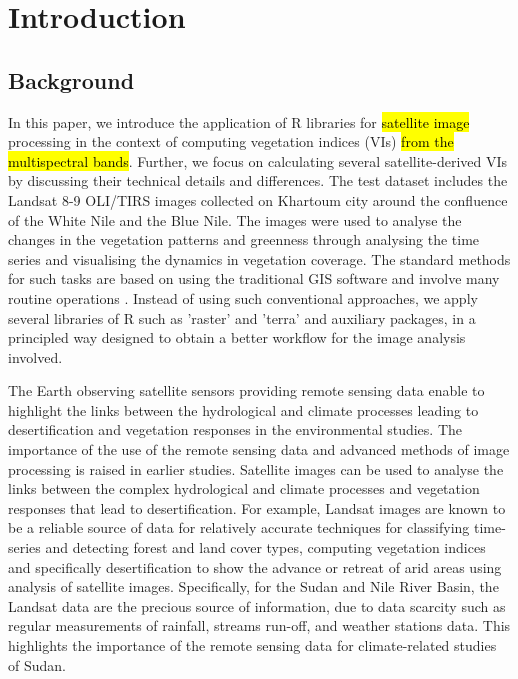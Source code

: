 \documentclass[jimaging,article,submit,pdftex,moreauthors]{Definitions/mdpi}
\begin{document}
\section{Introduction}

\subsection{Background}

In this paper, we introduce the application of R libraries for \hl{satellite image} processing in the context of computing vegetation indices (VIs) \hl{from the multispectral bands}. Further, we focus on calculating several satellite-derived VIs by discussing their technical details and differences. The test dataset includes the Landsat 8-9 OLI/TIRS images collected on Khartoum city around the confluence of the White Nile and the Blue Nile. The images were used to analyse the changes in the vegetation patterns and greenness through analysing the time series and visualising the dynamics in vegetation coverage. The standard methods for such tasks are based on using the traditional GIS software \cite{AHMED201829} and involve many\hl{ }routine operations \cite{Hawash,YOUSSEF2020103777,6621869,Aldoma}. Instead of using such conventional approaches, we apply several libraries of R such as 'raster' and 'terra' and auxiliary packages, in a principled way designed to obtain a better workflow for the image analysis involved.

The Earth observing satellite sensors providing remote sensing data enable to highlight the links between the hydrological and climate processes leading to desertification and vegetation responses in the environmental studies. The importance of the use of the remote sensing data and advanced methods of image processing is raised in earlier studies\cite{su14137871,ELBASTAWESY2017252,SOSNOWSKI201651,GORSEVSKI201364}. Satellite images can be used to analyse the links between the complex hydrological and climate processes and vegetation responses that lead to desertification. For example, Landsat images are known to be a reliable source of data for relatively accurate techniques for classifying time-series and detecting forest and land cover types\cite{WILSON2002385,Lemenkova202227,4293065,SALIH2017S21}, computing vegetation indices \cite{5416935,Lemenkova202229,1026428} and specifically desertification \cite{RIVERAMARIN2022104829} to show the advance or retreat of arid areas using analysis of satellite images. Specifically, for the Sudan and Nile River Basin, the Landsat data are the precious source of information, due to data scarcity \cite{Ali} such as regular measurements of rainfall, streams run-off, and  weather stations data. This highlights the importance of the remote sensing data for climate-related studies of Sudan.
\end{document}
